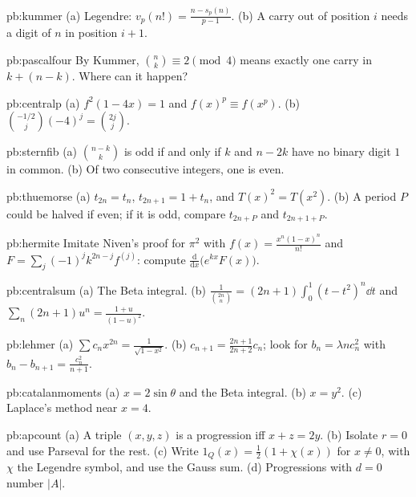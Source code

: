\begin{hint}{pb:kummer}
(a) Legendre: $v_p(n!)=\frac{n-s_p(n)}{p-1}$. (b) A carry out of position $i$ needs a digit of $n$ in position $i+1$.
\end{hint}

\begin{hint}{pb:pascalfour}
By Kummer, $\binom nk\equiv2\pmod4$ means exactly one carry in $k+(n-k)$. Where can it happen?
\end{hint}

\begin{hint}{pb:centralp}
(a) $f^2(1-4x)=1$ and $f(x)^p\equiv f(x^p)$. (b) $\binom{-1/2}j(-4)^j=\binom{2j}j$.
\end{hint}

\begin{hint}{pb:sternfib}
(a) $\binom{n-k}k$ is odd if and only if $k$ and $n-2k$ have no binary digit $1$ in common. (b) Of two consecutive integers, one is
even.
\end{hint}

\begin{hint}{pb:thuemorse}
(a) $t_{2n}=t_n$, $t_{2n+1}=1+t_n$, and $T(x)^2=T(x^2)$. (b) A period $P$ could be halved if even; if it is odd, compare
$t_{2n+P}$ and $t_{2n+1+P}$.
\end{hint}

\begin{hint}{pb:hermite}
Imitate Niven's proof for $\pi^2$ with $f(x)=\frac{x^n(1-x)^n}{n!}$ and $F=\sum_j(-1)^jk^{2n-j}f^{(j)}$: compute $\frac{\mathrm d}{\mathrm dx}\bigl(e^{kx}F(x)\bigr)$.
\end{hint}

\begin{hint}{pb:centralsum}
(a) The Beta integral. (b) $\frac1{\binom{2n}n}=(2n+1)\int_0^1(t-t^2)^n\dd t$ and $\sum_n(2n+1)u^n=\frac{1+u}{(1-u)^2}$.
\end{hint}

\begin{hint}{pb:lehmer}
(a) $\sum c_nx^{2n}=\frac1{\sqrt{1-x^2}}$. (b) $c_{n+1}=\frac{2n+1}{2n+2}c_n$; look for $b_n=\lambda nc_n^2$ with $b_n-b_{n+1}=\frac{c_n^2}{n+1}$.
\end{hint}

\begin{hint}{pb:catalanmoments}
(a) $x=2\sin\theta$ and the Beta integral. (b) $x=y^2$. (c) Laplace's method near $x=4$.
\end{hint}

\begin{hint}{pb:apcount}
(a) A triple $(x,y,z)$ is a progression iff $x+z=2y$. (b) Isolate $r=0$ and use Parseval for the rest. (c) Write $1_Q(x)=\frac12(1+\chi(x))$
for $x\ne0$, with $\chi$ the Legendre symbol, and use the Gauss sum. (d) Progressions with $d=0$ number $|A|$.
\end{hint}


